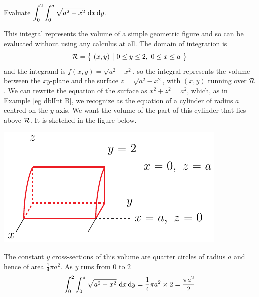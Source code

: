\begin{eg}\label{eg dblInt C}
Evaluate $\displaystyle\int_0^2\int_0^a \sqrt{a^2-x^2}\ \dee{x}\,\dee{y}$.

\soln This integral represents the volume of a simple geometric figure
and so can be evaluated without using any calculus at all.
The domain of integration is
\begin{equation*}
\mathcal{R}=\big\{ \ (x,y)\ \big|\ 0\le y\le 2,\  0\le x\le a\ \big\}
\end{equation*}
and the integrand is $f(x,y) = \sqrt{a^2-x^2}$, so the integral 
represents the volume between the $xy$-plane and the surface 
$z=\sqrt{a^2-x^2}$, with $(x,y)$ running over $\mathcal{R}$. We can rewrite 
the equation of the surface as $x^2+z^2=a^2$, which, as in 
Example \ref{eg dblInt B}, we recognize as the 
equation of a cylinder of radius $a$ centred on the $y$-axis.
We want the volume of the part of this cylinder that lies above
$\mathcal{R}$. It is sketched in the figure below.
\begin{efig}
\begin{center}
   \includegraphics{qCylinder.pdf}\qquad\qquad
\end{center}
\end{efig}
The constant $y$ cross-sections of this volume are quarter
circles of radius $a$ and hence of area $\frac{1}{4}\pi a^2$. 
As $y$ runs from $0$ to $2$
\begin{equation*}
\int_0^2\int_0^a \sqrt{a^2-x^2}\ \dee{x}\,\dee{y}
=\frac{1}{4}\pi a^2\times 2
=\frac{\pi a^2}{2} 
\end{equation*}
\end{eg}


